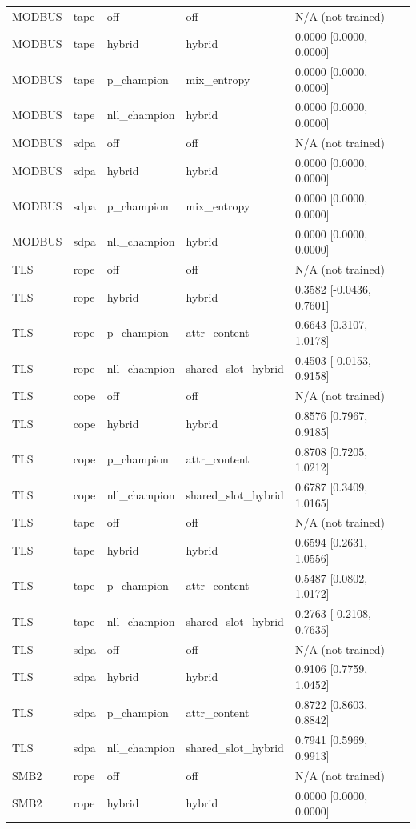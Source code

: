 \begin{tabular}{lllll}
MODBUS & tape & off & off & N/A (not trained) \\
MODBUS & tape & hybrid & hybrid & 0.0000 [0.0000, 0.0000] \\
MODBUS & tape & p\_champion & mix\_entropy & 0.0000 [0.0000, 0.0000] \\
MODBUS & tape & nll\_champion & hybrid & 0.0000 [0.0000, 0.0000] \\
MODBUS & sdpa & off & off & N/A (not trained) \\
MODBUS & sdpa & hybrid & hybrid & 0.0000 [0.0000, 0.0000] \\
MODBUS & sdpa & p\_champion & mix\_entropy & 0.0000 [0.0000, 0.0000] \\
MODBUS & sdpa & nll\_champion & hybrid & 0.0000 [0.0000, 0.0000] \\
TLS & rope & off & off & N/A (not trained) \\
TLS & rope & hybrid & hybrid & 0.3582 [-0.0436, 0.7601] \\
TLS & rope & p\_champion & attr\_content & 0.6643 [0.3107, 1.0178] \\
TLS & rope & nll\_champion & shared\_slot\_hybrid & 0.4503 [-0.0153, 0.9158] \\
TLS & cope & off & off & N/A (not trained) \\
TLS & cope & hybrid & hybrid & 0.8576 [0.7967, 0.9185] \\
TLS & cope & p\_champion & attr\_content & 0.8708 [0.7205, 1.0212] \\
TLS & cope & nll\_champion & shared\_slot\_hybrid & 0.6787 [0.3409, 1.0165] \\
TLS & tape & off & off & N/A (not trained) \\
TLS & tape & hybrid & hybrid & 0.6594 [0.2631, 1.0556] \\
TLS & tape & p\_champion & attr\_content & 0.5487 [0.0802, 1.0172] \\
TLS & tape & nll\_champion & shared\_slot\_hybrid & 0.2763 [-0.2108, 0.7635] \\
TLS & sdpa & off & off & N/A (not trained) \\
TLS & sdpa & hybrid & hybrid & 0.9106 [0.7759, 1.0452] \\
TLS & sdpa & p\_champion & attr\_content & 0.8722 [0.8603, 0.8842] \\
TLS & sdpa & nll\_champion & shared\_slot\_hybrid & 0.7941 [0.5969, 0.9913] \\
SMB2 & rope & off & off & N/A (not trained) \\
SMB2 & rope & hybrid & hybrid & 0.0000 [0.0000, 0.0000] \\

\end{tabular}
